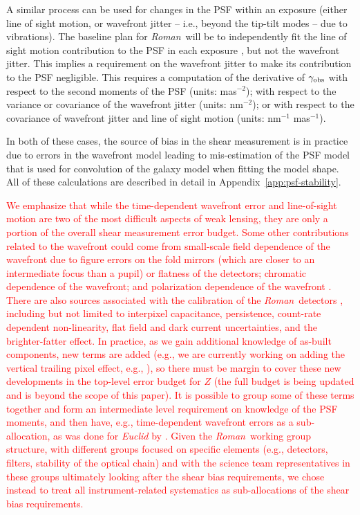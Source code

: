 \documentclass[usenatbib]{mnras}
\newcommand{\wfirst}{{\slshape Roman}}
\newcommand{\changetext}[1]{\textcolor{red}{#1}}
\begin{document}
A similar process can be used for changes in the PSF within an exposure (either line of sight motion, or wavefront jitter -- i.e., beyond the tip-tilt modes -- due to vibrations). The baseline plan for \wfirst\ will be to independently fit the line of sight motion contribution to the PSF in each exposure \citep{2012SPIE.8442E..10J}, but not the wavefront jitter. This implies a requirement on the wavefront jitter to make its contribution to the PSF negligible. This requires a computation of the derivative of $\gamma_{\rm obs}$ with respect to the second moments of the PSF (units: mas$^{-2}$); with respect to the variance or covariance of the wavefront jitter (units: nm$^{-2}$); or with respect to the covariance of wavefront jitter and line of sight motion (units: nm$^{-1}$ mas$^{-1}$).

In both of these cases, the source of bias in the shear measurement is in practice due to errors in the wavefront model leading to mis-estimation of the PSF model that is used for convolution of the galaxy model when fitting the model shape. All of these calculations are described in detail in Appendix~\ref{app:psf-stability}.

\changetext{We emphasize that while the time-dependent wavefront error and line-of-sight motion are two of the most difficult aspects of weak lensing, they are only a portion of the overall shear measurement error budget. Some other contributions related to the wavefront could come from small-scale field dependence of the wavefront due to figure errors on the fold mirrors (which are closer to an intermediate focus than a pupil) or flatness of the detectors; chromatic dependence of the wavefront; and polarization dependence of the wavefront \citep{2020MNRAS.tmp.1430L}. There are also sources associated with the calibration of the \wfirst\ detectors \citep{2020arXiv200500505M}, including but not limited to interpixel capacitance, persistence, count-rate dependent non-linearity, flat field and dark current uncertainties, and the brighter-fatter effect. In practice, as we gain additional knowledge of as-built components, new terms are added (e.g., we are currently working on adding the vertical trailing pixel effect, e.g., \citealt{2020arXiv200305978F}), so there must be margin to cover these new developments in the top-level error budget for $Z$ (the full budget is being updated and is beyond the scope of this paper). It is possible to group some of these terms together and form an intermediate level requirement on knowledge of the PSF moments, and then have, e.g., time-dependent wavefront errors as a sub-allocation, as was done for {\slshape Euclid} by \citet{2013MNRAS.431.3103C}. Given the \wfirst\ working group structure, with different groups focused on specific elements (e.g., detectors, filters, stability of the optical chain) and with the science team representatives in these groups ultimately looking after the shear bias requirements, we chose instead to treat all instrument-related systematics as sub-allocations of the shear bias requirements.}
\end{document}
